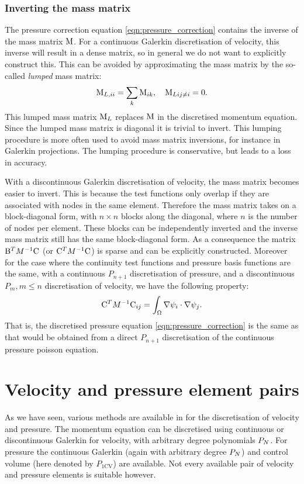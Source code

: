 \subsubsection{Inverting the mass matrix}
\label{sec:ND_cg_mass_lumping}
The pressure correction equation \eqref{eqn:pressure_correction} contains
the inverse of the mass matrix $\mathrm{M}$. For a continuous Galerkin
discretisation of velocity, this inverse will result in a dense
matrix, so in general we do not want to explicitly construct
this. This can be avoided by approximating the mass matrix by the
so-called \emph{lumped} mass matrix:
\begin{equation*}
  \mathrm{M}_{L,ii}=\sum_k \mathrm{M}_{ik},\quad \mathrm{M}_{Lij\neq i}=0.
\end{equation*}
This lumped mass matrix $\mathrm{M}_L$ replaces $\mathrm{M}$ in the
discretised momentum equation. Since the lumped mass matrix is
diagonal it is trivial to invert. This lumping procedure is more
often used to avoid mass matrix inversions, for instance in
Galerkin projections. The lumping procedure is conservative,
but leads to a loss in accuracy.

With a discontinuous Galerkin discretisation of velocity, the mass matrix
becomes easier to invert. This is because the test functions only overlap
if they are associated with nodes in the same element. Therefore the mass
matrix takes on a block-diagonal form, with $n\times n$ blocks along
the diagonal, where $n$ is the number of nodes per element. These blocks
can be independently inverted and the inverse mass matrix still has the
same block-diagonal form. As a consequence the matrix
$\mathrm{B}^T M^{-1} \mathrm{C}$ (or $\mathrm{C}^T M^{-1} \mathrm{C}$) is sparse and can be explicitly
constructed. Moreover for the case where the continuity test functions and pressure 
basis functions are the same, with a continuous $P_{n+1}$ discretisation of pressure,
and a discontinuous $P_m, m\leq n$ discretisation of velocity, we
have the following property\citep{cotter2009}:
\begin{equation*}
  \mathrm{C}^T M^{-1} \mathrm{C}_{ij}=\int_\Omega \nabla \psi_i\cdot\nabla \psi_j.
\end{equation*}
That is, the discretised pressure equation \eqref{eqn:pressure_correction}
is the same as that would be obtained from a direct $P_{n+1}$
discretisation of the continuous pressure poisson equation.

\section{Velocity and pressure element pairs}
\label{sec:velocity_pressure_element_pairs}
As we have seen, various methods are available in \fluidity for the discretisation of
velocity and pressure. The momentum equation can be discretised
using continuous or discontinuous Galerkin for velocity, with arbitrary degree
polynomials $P_N$. For pressure the continuous Galerkin (again with arbitrary degree $P_N$)
and control volume (here denoted by $P_{1\text{CV}}$) are available. Not every available 
pair of velocity and pressure elements is suitable however.

